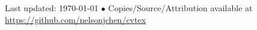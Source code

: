 \documentclass[10pt, letter]{article}
\newcommand{\reference}[4]{
\subsection*{#1 | {\footnotesize{#2}}}
#3 -- \href{mailto:#4}{\texttt{#4}}
}
\begin{document}
\begin{multicols}{2}







\end{multicols}

\begin{center}
{\scriptsize  Last updated: \today\- $\bullet$\-
Copies/Source/Attribution available at \href{https://github.com/nelsonjchen/cvtex}{https://github.com/nelsonjchen/cvtex}}
\end{center}
\end{document}
